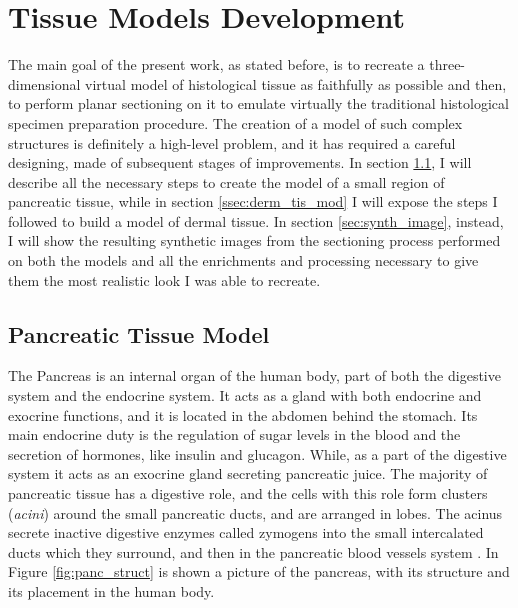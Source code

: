 \documentclass[12pt,a4paper]{report}
\providecommand{\DIFaddend}{} %
\DeclareRobustCommand{\DIFaddend}{\DIFOaddend \let\includegraphics\DIFOincludegraphics} %
\begin{document}
        \DIFaddend \clearpage

    \chapter{Tissue Models Development} \label{sec:models}
        The main goal of the present work, as stated before, is to recreate a three-dimensional virtual model of histological tissue as faithfully as possible and then, to perform planar sectioning on it to emulate virtually the traditional histological specimen preparation procedure. The creation of a model of such complex structures is definitely a high-level problem, and it has required a careful designing, made of subsequent stages of improvements. 
In section \ref{ssec:panc_tis_mod}, I will describe all the necessary steps to create the model of a small region of pancreatic tissue, while in section \ref{ssec:derm_tis_mod} I will expose the steps I followed to build a model of dermal tissue. In section \ref{sec:synth_image}, instead, I will show the resulting synthetic images from the sectioning process performed on both the models and all the enrichments and processing necessary to give them the most realistic look I was able to recreate.

        \section{Pancreatic Tissue Model} \label{ssec:panc_tis_mod}
The Pancreas is an internal organ of the human body, part of both the digestive system and the endocrine system. It acts as a gland with both endocrine and exocrine functions, and it is located in the abdomen behind the stomach. Its main endocrine duty is the regulation of sugar levels in the blood and the secretion of hormones, like insulin and glucagon. While, as a part of the digestive system it acts as an exocrine gland secreting pancreatic juice. The majority of pancreatic tissue has a digestive role, and the cells with this role form clusters (\textit{acini}) around the small pancreatic ducts, and are arranged in lobes. The acinus secrete inactive digestive enzymes called zymogens into the small intercalated ducts which they surround, and then in the pancreatic blood vessels system \cite{Pancreas}. In Figure \ref{fig:panc_struct} is shown a picture of the pancreas, with its structure and its placement in the human body.
\end{document}
